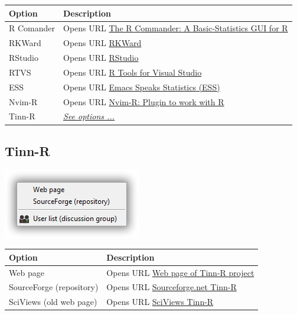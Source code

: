 \begin{scriptsize}
  \begin{tabularx}{\textwidth}{>{\hsize=0.3\hsize}X>{\hsize=0.7\hsize}X}\\
    \hline
    \textbf{Option} & \textbf{Description} \\
    \hline
    R Comander & Opens URL \href{http://socserv.socsci.mcmaster.ca/jfox/Misc/Rcmdr/index.html}{The R Commander: A Basic-Statistics GUI for R} \\
    RKWard & Opens URL \href{https://rkward.kde.org/}{RKWard} \\
    RStudio & Opens URL \href{http://www.rstudio.com/}{RStudio} \\
    RTVS & Opens URL \href{http://microsoft.github.io/RTVS-docs/}{R Tools for Visual Studio} \\
    ESS & Opens URL \href{http://ess.r-project.org/}{Emacs Speaks Statistics (ESS)} \\
    Nvim-R & Opens URL \href{http://www.vim.org/scripts/script.php?script\_id=2628}{Nvim-R: Plugin to work with R} \\
    Tinn-R & \textit{\href{\#menu\_web\_tinnr}{See options ...}} \\
    \hline
  \end{tabularx}
\end{scriptsize}


\hypertarget{menu_web_tinnr}{}
\subsection{Tinn-R}

\includegraphics[scale=0.50]{./res/menu_web_tinnr.png}\\


\begin{scriptsize}
  \begin{tabularx}{\textwidth}{>{\hsize=0.3\hsize}X>{\hsize=0.7\hsize}X}\\
    \hline
    \textbf{Option} & \textbf{Description} \\
    \hline
    Web page & Opens URL \href{https://tinn-r.org/en/}{Web page of Tinn-R project} \\
    SourceForge (repository) & Opens URL \href{http://sourceforge.net/projects/tinn-r}{Sourceforge.net Tinn-R} \\
    SciViews (old web page) & Opens URL \href{http://www.sciviews.org/Tinn-R/}{SciViews Tinn-R} \\
    \hline
  \end{tabularx}
\end{scriptsize}


